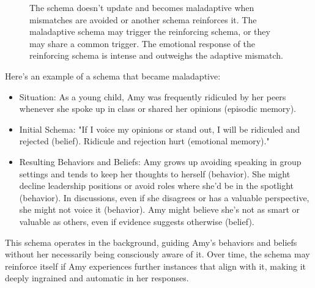 \documentclass[12pt,letterpaper]{article}
\begin{document}
\begin{figure}[h!]
\begin{framed}
\end{framed}
\caption{The schema doesn't update and becomes maladaptive when mismatches are avoided or another schema reinforces it. The maladaptive schema may trigger the reinforcing schema, or they may share a common trigger. The emotional response of the reinforcing schema is intense and outweighs the adaptive mismatch.}
\label{fig:maladaptiveSchema1}
\end{figure}
\FloatBarrier
Here's an example of a schema that became maladaptive:
\begin{itemize}
    \item Situation: As a young child, Amy was frequently ridiculed by her peers whenever she spoke up in class or shared her opinions (episodic memory).
    \item Initial Schema: "If I voice my opinions or stand out, I will be ridiculed and rejected (belief). Ridicule and rejection hurt (emotional memory)."
    \item Resulting Behaviors and Beliefs: Amy grows up avoiding speaking in group settings and tends to keep her thoughts to herself (behavior). She might decline leadership positions or avoid roles where she'd be in the spotlight (behavior). In discussions, even if she disagrees or has a valuable perspective, she might not voice it (behavior). Amy might believe she's not as smart or valuable as others, even if evidence suggests otherwise (belief).
\end{itemize}
This schema operates in the background, guiding Amy's behaviors and beliefs without her necessarily being consciously aware of it. Over time, the schema may reinforce itself if Amy experiences further instances that align with it, making it deeply ingrained and automatic in her responses.
\end{document}
